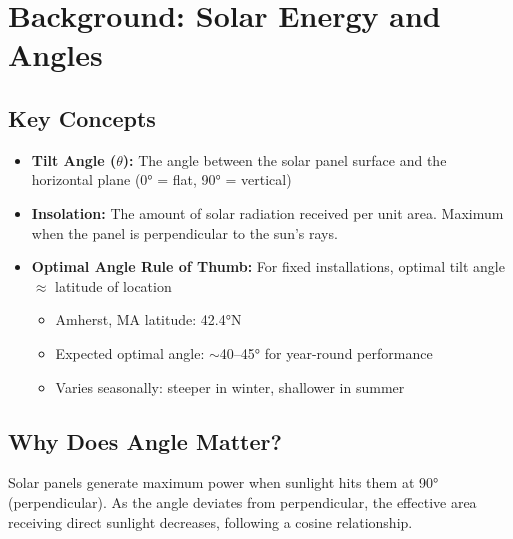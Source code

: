 \documentclass[11pt,twoside]{article}
\numberwithin{equation}{section}
\newcommand{\?}{\stackrel{?}{=}}
\begin{document}
\section{Background: Solar Energy and Angles}

\subsection*{Key Concepts}

\begin{itemize}
    \item \textbf{Tilt Angle ($\theta$):} The angle between the solar panel surface and the horizontal plane (0° = flat, 90° = vertical)

\item \textbf{Insolation:} The amount of solar radiation received per unit area. Maximum when the panel is perpendicular to the sun's rays.

\item \textbf{Optimal Angle Rule of Thumb:} For fixed installations, optimal tilt angle $\approx$ latitude of location
\begin{itemize} 
    \item Amherst, MA latitude: 42.4°N
    \item Expected optimal angle: $\sim$40--45° for year-round performance
    \item Varies seasonally: steeper in winter, shallower in summer
\end{itemize}
\end{itemize}




\subsection*{Why Does Angle Matter?}

Solar panels generate maximum power when sunlight hits them at 90° (perpendicular). As the angle deviates from perpendicular, the effective area receiving direct sunlight decreases, following a cosine relationship.
\end{document}
